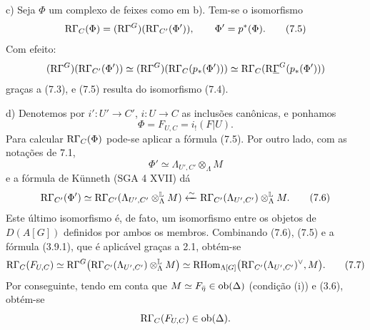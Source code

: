 c) Seja $\Phi$ um complexo de feixes como em b). Tem-se o isomorfismo
\[
\mathrm{R}\Gamma_C(\Phi)=(\mathrm{R}\Gamma^G)(\mathrm{R}\Gamma_{C'}(\Phi')),
\qquad \Phi'=p^*(\Phi).
\tag{7.5}
\]
Com efeito:
\[
(\mathrm{R}\Gamma^G)(\mathrm{R}\Gamma_{C'}(\Phi'))
\simeq
(\mathrm{R}\Gamma^G)(\mathrm{R}\Gamma_C(p_*(\Phi')))
\simeq
\mathrm{R}\Gamma_C(\mathrm{R}\underline{\Gamma}^G(p_*(\Phi')))
\]
graças a (7.3), e (7.5) resulta do isomorfismo (7.4).

d) Denotemos por $i':U'\to C'$, $i:U\to C$ as inclusões canônicas, e ponhamos
\[
\Phi=F_{U,C}=i_!(F|U).
\]
Para calcular $\mathrm{R}\Gamma_C(\Phi)$ pode-se aplicar a fórmula (7.5). Por outro lado, com as notações de 7.1,
\[
\Phi'\simeq \Lambda_{U',C'}\otimes_\Lambda M
\]
e a fórmula de Künneth (SGA 4 XVII) dá
\[
\mathrm{R}\Gamma_{C'}(\Phi')
\simeq
\mathrm{R}\Gamma_{C'}(\Lambda_{U',C'}\otimes_\Lambda^{\mathbb L} M)
\xleftarrow{\sim}
\mathrm{R}\Gamma_{C'}(\Lambda_{U',C'})\otimes_\Lambda^{\mathbb L} M.
\tag{7.6}
\]
Este último isomorfismo é, de fato, um isomorfismo entre os objetos de $D(A[G])$ definidos por ambos os membros. Combinando (7.6), (7.5) e a fórmula (3.9.1), que é aplicável graças a 2.1, obtém-se
\[
\mathrm{R}\Gamma_C(F_{U,C})
\simeq
\mathrm{R}\Gamma^G\bigl(\mathrm{R}\Gamma_{C'}(\Lambda_{U',C'})\otimes_\Lambda^{\mathbb L} M\bigr)
\simeq
\mathrm{RHom}_{\Lambda[G]}\bigl(\mathrm{R}\Gamma_{C'}(\Lambda_{U',C'})^\vee,M\bigr).
\tag{7.7}
\]
Por conseguinte, tendo em conta que $M\simeq F_{\bar\eta}\in\operatorname{ob}(\Delta)$ (condição (i)) e (3.6), obtém-se
\[
\mathrm{R}\Gamma_C(F_{U,C})\in\operatorname{ob}(\Delta).
\]

